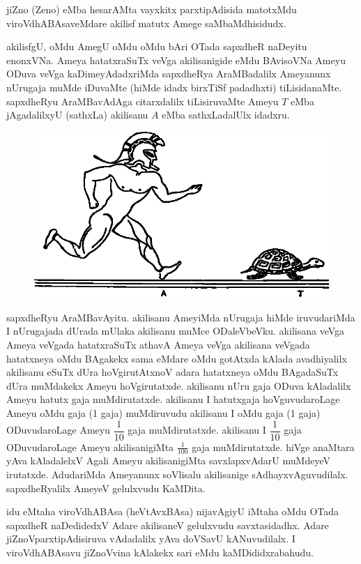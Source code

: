 jiZno {\rm (Zeno)} eMba hesarAMta vayxkitx parxtipAdisida matotxMdu viroVdhABAsa\-veMdare akilisf matutx Amege saMbaMdhisidudx.

akilisfgU, oMdu AmegU oMdu oMdu bAri OTada sapxdheR naDeyitu enonxVNa. Ameya hatatxraSuTx veVga akilisanigide eMdu BAvisoVNa Ameyu ODuva veVga kaDimeyAdadxriMda sapxdheRya AraMBadalilx Ameyanunx nUrugaja muMde iDuvaMte (hiMde idadx birxTiSf padadhxti) tiLisidanaMte. sapxdheRyu AraMBavAdAga citarxdalilx tiLisiruvaMte Ameyu $T$ eMba jAgadalilxyU (sathxLa) akilisanu $A$ eMba sathxLadalUlx idadxru. 
\begin{figure}[H]
\centering
\includegraphics[scale=.7]{src/figures/m_085.eps}
\end{figure}


sapxdheRyu AraMBavAyitu. akilisanu AmeyiMda nUrugaja hiMde iruvuda\-riMda I nUrugajada dUrada mUlaka akilisanu muMce ODaleVbeVku. akilisana veVga Ameya veVgada hatatxraSuTx athavA Ameya veVga akilisana veVgada hatatxneya oMdu BAgakekx sama eMdare oMdu gotAtxda kAlada avadhiyalilx akilisanu eSuTx dUra hoVgirutAtxnoV adara hatatxneya oMdu BAgadaSuTx dUra muMdakekx Ameyu hoVgirutatxde. akilisanu nUru gaja ODuva kAladalilx Ameyu hatutx gaja muMdirutatxde. akilisanu I hatutxgaja hoVguvudaroLage Ameyu oMdu gaja ({\rm 1} gaja) muMdiruvudu akilisanu I oMdu gaja ({\rm 1} gaja) ODuvudaroLage Ameyu $\dfrac{1}{10}$ gaja muMdirutatxde. akilisanu I $\dfrac{1}{10}$ gaja ODuvudaroLage Ameyu akilisanigiMta $\frac{1}{100}$ gaja muMdirutatxde. hiVge anaMtara yAva kAladalelxV Agali Ameyu akilisanigiMta savxlapxvAdarU muMdeyeV irutatxde. AdudariMda Ameyanunx soVlisalu akilisanige sAdhayxvAguvudilalx. sapxdheRyalilx AmeyeV gelulxvudu KaMDita.

idu eMtaha viroVdhABAsa (heVtAvxBAsa) nijavAgiyU iMtaha oMdu OTada sapxdheR naDedidedxV Adare akilisaneV gelulxvudu savxtasidadhx. Adare jiZnoVparxtipAdisiruva vAdadalilx yAva doVSavU kANuvudilalx. I viroVdhABAsavu  jiZnoVvina kAlakekx sari eMdu kaMDididxrabahudu.

